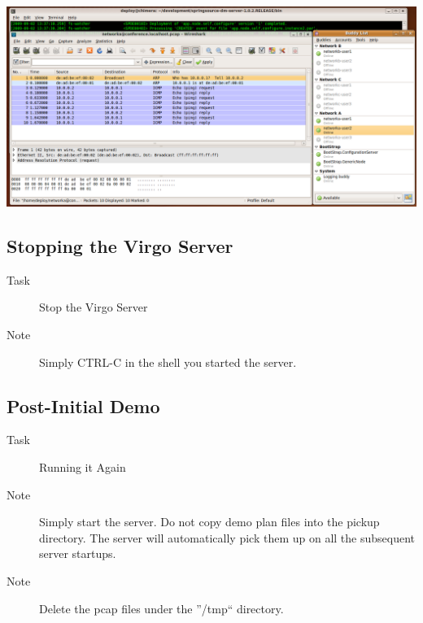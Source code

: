 \begin{center}
\includegraphics[scale=0.3]{figs/deploy/pidgin-4.png} 
\end{center}

\subsection{Stopping the Virgo Server}
\begin{description}
\item [Task] Stop the Virgo Server
\item [Note] Simply CTRL-C in the shell you started the server.
\end{description}

\subsection{Post-Initial Demo}
\begin{description}
\item [Task] Running it Again
\item [Note] Simply start the server. Do not copy demo plan files into the pickup directory.
The server will automatically pick them up on all the subsequent server startups.
\item[Note] Delete the pcap files under the ''/tmp`` directory.
\end{description}

